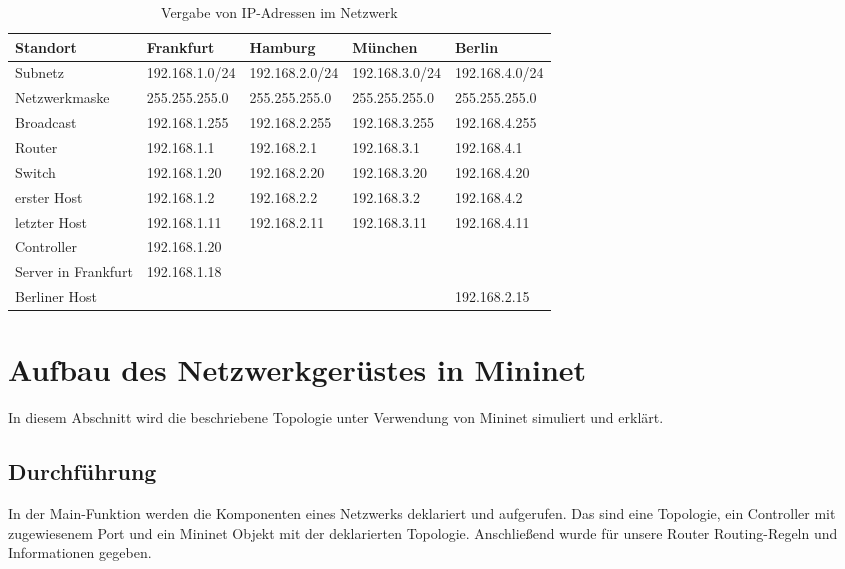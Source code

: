 \documentclass[fontsize=12pt,paper=a4,open=any,parskip=half,
  twoside=false,toc=listof,toc=bibliography,fleqn,leqno,
  captions=nooneline,captions=tableabove,british]{scrbook}
\begin{document}
\begin{table}[H]
	\caption{Vergabe von IP-Adressen im Netzwerk}
	\label{netzwerkplan}
	\centering
	\hspace*{-1cm}
	\begin{tabular}{|p{3.5cm} p{3cm} p{3cm} p{3cm} p{3cm}|}
		\toprule
		 Standort & Frankfurt & Hamburg & München & Berlin \\
		\midrule 
		Subnetz & 192.168.1.0/24 &  192.168.2.0/24 & 192.168.3.0/24 & 192.168.4.0/24\\
		
		
		Netzwerkmaske	&255.255.255.0& 255.255.255.0& 255.255.255.0	& 255.255.255.0 \\
		
		Broadcast & 192.168.1.255 &	192.168.2.255 &	192.168.3.255 & 192.168.4.255\\
		
		Router & 192.168.1.1&192.168.2.1& 192.168.3.1 &192.168.4.1\\
		
		Switch & 192.168.1.20& 192.168.2.20&192.168.3.20&	192.168.4.20\\
		
		erster Host& 192.168.1.2& 192.168.2.2& 192.168.3.2&192.168.4.2\\
		
		letzter Host& 192.168.1.11 & 192.168.2.11 & 192.168.3.11 & 192.168.4.11\\
		
		Controller &192.168.1.20&	& &\\
		
		Server in Frankfurt & 192.168.1.18 & & & \\
		
		Berliner Host & & & & 192.168.2.15 \\
		
		\hline
	\end{tabular}
	
\end{table}

\section{Aufbau des Netzwerkgerüstes in Mininet}
In diesem Abschnitt wird die beschriebene Topologie unter Verwendung von Mininet simuliert und erklärt.

\subsection{Durchführung}
In der Main-Funktion werden die Komponenten eines Netzwerks deklariert und aufgerufen. Das sind eine Topologie, ein Controller mit zugewiesenem Port und ein Mininet Objekt mit der deklarierten Topologie. Anschließend wurde für unsere Router Routing-Regeln und Informationen gegeben.
\end{document}
